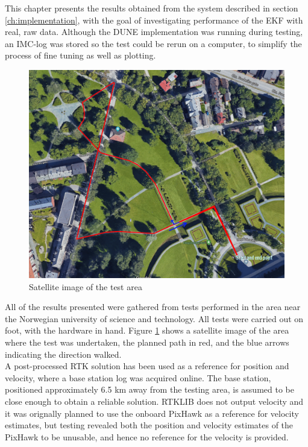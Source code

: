 This chapter presents the results obtained from the system described in section \ref{ch:implementation}, with the goal of investigating performance of the EKF with real, raw data. Although the DUNE implementation was running during testing, an IMC-log was stored so the test could be rerun on a computer, to simplify the process of fine tuning as well as plotting.\\ 


% 

    \begin{figure}[!htbp]
        \centering
        \includegraphics[scale=0.2]{Results/Images/sat-path.png}
        \caption{Satellite image of the test area}
        \label{fig:sat-path}
    \end{figure}
    
All of the results presented were gathered from tests performed in the area near the Norwegian university of science and technology. All tests were carried out on foot, with the hardware in hand. Figure \ref{fig:sat-path} shows a satellite image of the area where the test was undertaken, the planned path in red, and the blue arrows indicating the direction walked.\\

A post-processed RTK solution has been used as a reference for position and velocity, where a base station log was acquired online. The base station, positioned approximately 6.5 km away from the testing area, is assumed to be close enough to obtain a reliable solution. RTKLIB does not output velocity and it was orignally planned to use the onboard PixHawk as a reference for velocity estimates, but testing revealed both the position and velocity estimates of the PixHawk to be unusable, and hence no reference for the velocity is provided.\\


